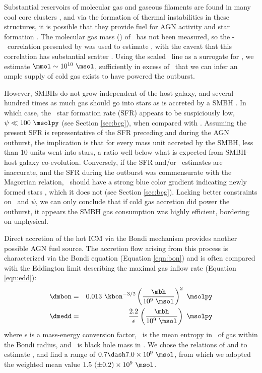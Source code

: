 \documentclass{emulateapj}
\begin{document}
Substantial reservoirs of molecular gas and gaseous filaments are
found in many cool core clusters \citep{crawford99, edge01}, and via
the formation of thermal instabilities in these structures, it is
possible that they provide fuel for AGN activity and star formation
\citep[\eg][]{pizzolato05, 2010arXiv1003.4181P}. The molecular gas
mass (\mmol) of \rbs\ has not been measured, so the
\halpha-\mmol\ correlation presented by \citet{edge01} was used to
estimate \mmol, with the caveat that this correlation has substantial
scatter \citep{salome03}. Using the scaled \hbeta\ line as a surrogate
for \halpha, we estimate $\mmol \sim 10^{10} ~\msol$, sufficiently in
excess of \macc\ that we can infer an ample supply of cold gas exists
to have powered the outburst.

However, SMBHs do not grow independent of the host galaxy, and several
hundred times as much gas should go into stars as is accreted by a
SMBH \citep{1995ARA&A..33..581K, magorrian}. In which case, the
\rbs\ star formation rate (SFR) appears to be suspiciously low, $\psi
\ll 100 ~\msolpy$ (see Section \ref{sec:bcg}), when compared with
\dmacc. Assuming the present SFR is representative of the SFR
preceding and during the AGN outburst, the implication is that for
every mass unit accreted by the SMBH, less than 10 units went into
stars, a ratio well below what is expected from SMBH-host galaxy
co-evolution. Conversely, if the SFR and/or \dmacc\ estimates are
inaccurate, and the SFR during the outburst was commensurate with the
Magorrian relation, \rbs\ should have a strong blue color gradient
indicating newly formed stars \citep{rafferty08}, which it does not
(see Section \ref{sec:bcg}). Lacking better constraints on \mmol\ and
$\psi$, we can only conclude that if cold gas accretion did power the
outburst, it appears the SMBH gas consumption was highly efficient,
bordering on unphysical.

Direct accretion of the hot ICM via the Bondi mechanism provides
another possible AGN fuel source. The accretion flow arising from this
process is characterized via the Bondi equation (Equation
\ref{eqn:bon}) and is often compared with the Eddington limit
describing the maximal gas inflow rate (Equation \ref{eqn:edd}):
\begin{eqnarray}
  \dmbon &=& 0.013 ~\kbon^{-3/2} \left(\frac{\mbh}{10^9
    ~\msol}\right)^{2} ~\msolpy \label{eqn:bon}\\
  \dmedd &=& \frac{2.2}{\epsilon} \left(\frac{\mbh}{10^9~\msol}\right)
  ~\msolpy  \label{eqn:edd}
\end{eqnarray}
where $\epsilon$ is a mass-energy conversion factor, \kbon\ is the
mean entropy in \ent\ of gas within the Bondi radius, and \mbh\ is
black hole mass in \msol. We chose the relations of
\citet{2002ApJ...574..740T} and \citet{2007MNRAS.379..711G} to
estimate \mbh, and find a range of $0.7 \dash 7.0 \times 10^9 ~\msol$,
from which we adopted the weighted mean value $1.5 ~(\pm 0.2) \times
10^9 ~\msol$.
\end{document}
